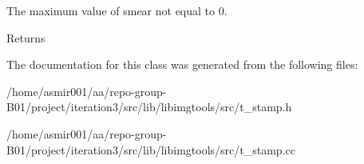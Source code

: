The maximum value of smear not equal to 0. 

\begin{DoxyReturn}{Returns}

\end{DoxyReturn}


The documentation for this class was generated from the following files\+:\begin{DoxyCompactItemize}
\item 
/home/asmir001/aa/repo-\/group-\/\+B01/project/iteration3/src/lib/libimgtools/src/t\+\_\+stamp.\+h\item 
/home/asmir001/aa/repo-\/group-\/\+B01/project/iteration3/src/lib/libimgtools/src/t\+\_\+stamp.\+cc\end{DoxyCompactItemize}
